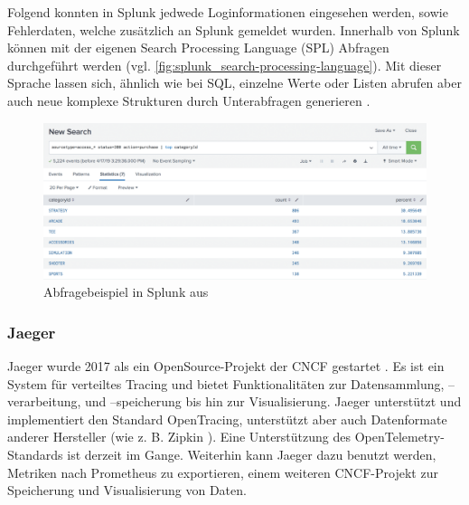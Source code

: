 Folgend konnten in Splunk jedwede Loginformationen eingesehen werden, sowie Fehlerdaten, welche zusätzlich an Splunk gemeldet wurden. Innerhalb von Splunk können mit der eigenen Search Processing Language (SPL) \cite{SplunkSPL} Abfragen durchgeführt werden (vgl. \autoref{fig:splunk_search-processing-language}). Mit dieser Sprache lassen sich, ähnlich wie bei SQL, einzelne Werte oder Listen abrufen aber auch neue komplexe Strukturen durch Unterabfragen generieren \cite{SplunkSQLtoSPL}.

\begin{figure}[H]
	\centering
	\includegraphics[width=\linewidth]{img/03_methoden/splunk_search-processing-language.png}
	\caption{Abfragebeispiel in Splunk aus \cite{SplunkSPL}}
	\label{fig:splunk_search-processing-language}
\end{figure}

\subsubsection{Jaeger}
\label{subsec:jaeger}

Jaeger wurde 2017 als ein OpenSource-Projekt der CNCF gestartet \cite{Jaeger}. Es ist ein System für verteiltes Tracing und bietet Funktionalitäten zur Datensammlung, --verarbeitung, und --speicherung bis hin zur Visualisierung. Jaeger unterstützt und implementiert den Standard OpenTracing, unterstützt aber auch Datenformate anderer Hersteller (wie z. B. Zipkin \cite{Zipkin}). Eine Unterstützung des OpenTelemetry-Standards ist derzeit im Gange. Weiterhin kann Jaeger dazu benutzt werden, Metriken nach Prometheus \cite{Prometheus} zu exportieren, einem weiteren CNCF-Projekt zur Speicherung und Visualisierung von Daten.


